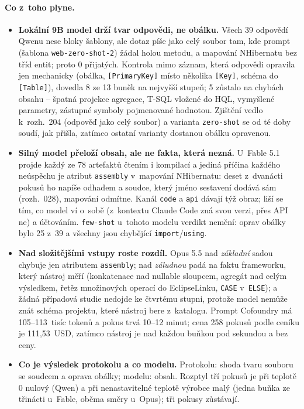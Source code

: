 \documentclass{article}
\begin{document}
\paragraph{Co z~toho plyne.}
\begin{itemize}[leftmargin=*,itemsep=2pt]
\item \textbf{Lokální 9B model drží tvar odpovědi, ne obálku.} Všech 39 odpovědí Qwenu nese bloky šablony, ale dotaz píše jako celý soubor tam, kde prompt (šablona \texttt{web-zero-shot-2}) žádal holou metodu, a mapování NHibernatu bez tříd entit; proto 0 přijatých. Kontrola mimo záznam, která odpovědi opravila jen mechanicky (obálka, \texttt{[PrimaryKey]} místo několika \texttt{[Key]}, schéma do \texttt{[Table]}), dovedla 8 ze 13 buněk na nejvyšší stupeň; 5 zůstalo na chybách obsahu -- špatná projekce agregace, T-SQL vložené do HQL, vymyšlené parametry, zástupné symboly pojmenované hodnotou. Zjištění vedlo k~rozh.~204 (odpověď jako celý soubor) a varianta \texttt{zero-shot} se od té doby soudí, jak přišla, zatímco ostatní varianty dostanou obálku opravenou.
\item \textbf{Silný model přeloží obsah, ale ne fakta, která nezná.} U~Fable 5.1 projde každý ze 78 artefaktů čtením i kompilací a jediná příčina každého neúspěchu je atribut \texttt{assembly} v~mapování NHibernatu: deset z~dvanácti pokusů ho napíše odhadem a soudce, který jméno sestavení dodává sám (rozh.~028), mapování odmítne. Kanál \texttt{code} a \texttt{api} dávají týž obraz; liší se tím, co model ví o~sobě (z~kontextu Claude Code zná svou verzi, přes API ne) a účtováním. \texttt{few-shot} u~tohoto modelu verdikt nemění: oprav obálky bylo 25 z~39 a všechny jsou chybějící \texttt{import}/\texttt{using}.
\item \textbf{Nad složitějšími vstupy roste rozdíl.} Opus 5.5 nad \emph{základní} sadou chybuje jen atributem \texttt{assembly}; nad \emph{záludnou} padá na faktu frameworku, který nástroj měří (konkatenace nad nullable sloupcem, agregát nad celým výsledkem, řetěz množinových operací do EclipseLinku, \texttt{CASE} v~\texttt{ELSE}); a žádná případová studie nedojde ke čtvrtému stupni, protože model nemůže znát schéma projektu, které nástroj bere z~katalogu. Prompt Cofoundry má 105--113~tisíc tokenů a pokus trvá 10--12 minut; cena 258 pokusů podle ceníku je 111,53~USD, zatímco nástroj je nad každou buňkou pod sekundou a bez ceny.
\item \textbf{Co je výsledek protokolu a co modelu.} Protokolu: shoda tvaru souboru se soudcem a oprava obálky; modelu: obsah. Rozptyl tří pokusů je při teplotě 0 nulový (Qwen) a při nenastavitelné teplotě výrobce malý (jedna buňka ze třinácti u~Fable, oběma směry u~Opus); tři pokusy zůstávají.
\end{itemize}
\end{document}
